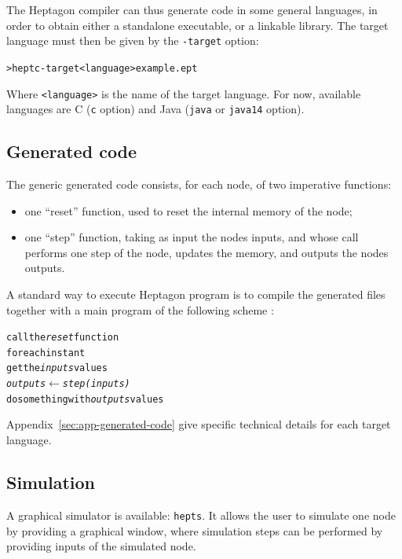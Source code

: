 \documentclass[a4paper]{article}
\begin{document}
The Heptagon compiler can thus generate code in some general languages, in order
to obtain either a standalone executable, or a linkable library. The target
language must then be given by the \texttt{-target} option:

\begin{alltt}
> heptc -target <language> example.ept
\end{alltt}

Where \texttt{<language>} is the name of the target language. For now, available
languages are C (\texttt{c} option) and Java (\texttt{java} or \texttt{java14} option).

\subsection{Generated code}
\label{sec:generated-code}

The generic generated code consists, for each node, of two imperative functions:
\begin{itemize}
\item one ``reset'' function, used to reset the internal memory of the node;
\item one ``step'' function, taking as input the nodes inputs, and whose call
  performs one step of the node, updates the memory, and outputs the nodes
  outputs.
\end{itemize}

A standard way to execute Heptagon program is to compile the generated files
together with a main program of the following scheme :

\begin{alltt}
call the \textit{reset} function
for each instant
   get the \textit{inputs} values
   \textit{outputs} \(\leftarrow\) \textit{step(inputs)}
   do something with \textit{outputs} values
\end{alltt}

Appendix~\ref{sec:app-generated-code} give specific technical details for each target language.


\subsection{Simulation}
\label{sec:simulation}

A graphical simulator is available: \texttt{hepts}. It allows the user to simulate
one node by providing a graphical window, where simulation steps can be
performed by providing inputs of the simulated node.
\end{document}
